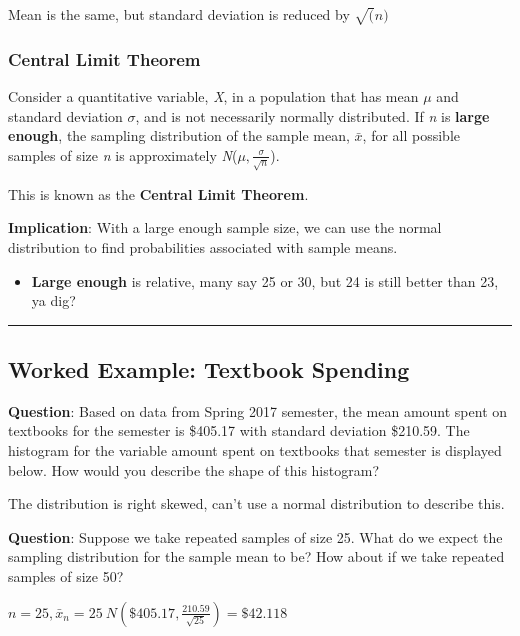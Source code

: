 \documentclass[
  openany]{book}
\providecommand{\tightlist}{%
  \setlength{\itemsep}{0pt}\setlength{\parskip}{0pt}}
\begin{document}
Mean is the same, but standard deviation is reduced by \(\sqrt(n)\)

\subsubsection{Central Limit Theorem}\label{central-limit-theorem}

Consider a quantitative variable, \emph{X}, in a population that has mean \(\mu\) and standard deviation \(\sigma\), and is not necessarily normally distributed. If \emph{n} is \textbf{large enough}, the sampling distribution of the sample mean, \(\bar{x}\), for all possible samples of size \emph{n} is approximately \emph{N}(\(\mu,\frac{\sigma}{\sqrt{n}}\)).

This is known as the \textbf{Central Limit Theorem}.

\textbf{Implication}: With a large enough sample size, we can use the normal distribution to find probabilities associated with sample means.

\begin{itemize}
\tightlist
\item
  \textbf{Large enough} is relative, many say 25 or 30, but 24 is still better than 23, ya dig?
\end{itemize}

\begin{center}\rule{0.5\linewidth}{0.5pt}\end{center}

\subsection{Worked Example: Textbook Spending}\label{worked-example-textbook-spending}

\textbf{Question}: Based on data from Spring 2017 semester, the mean amount spent on textbooks for the semester is \$405.17 with standard deviation \$210.59. The histogram for the variable amount spent on textbooks that semester is displayed below. How would you describe the shape of this histogram?

The distribution is right skewed, can't use a normal distribution to describe this.

\textbf{Question}: Suppose we take repeated samples of size 25. What do we expect the sampling distribution for the sample mean to be? How about if we take repeated samples of size 50?

\(n=25, \bar{x}_n=25 ~ N(\$405.17,\frac{210.59}{\sqrt{25}}) = \$42.118\)
\end{document}
